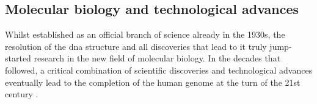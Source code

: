 


\subsection{Molecular biology and technological advances}

Whilst established as an official branch of science already in the 1930s, the resolution of the \gls{dna} structure and all discoveries that lead to it truly jump-started research in the new field of molecular biology.
In the decades that followed, a critical combination of scientific discoveries and technological advances eventually lead to the completion of the human genome at the turn of the 21st century \cite{nhgri2003genetic}.


